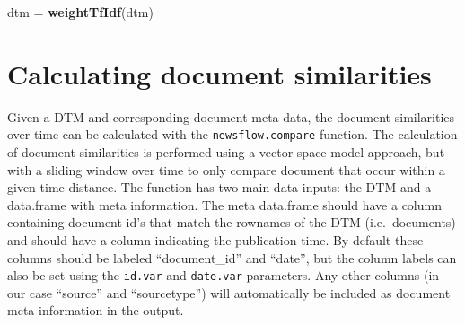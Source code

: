 \documentclass[]{article}
\newenvironment{Shaded}{\begin{snugshade}}{\end{snugshade}}
\newcommand{\KeywordTok}[1]{\textcolor[rgb]{0.13,0.29,0.53}{\textbf{{#1}}}}
\newcommand{\StringTok}[1]{\textcolor[rgb]{0.31,0.60,0.02}{{#1}}}
\newcommand{\NormalTok}[1]{{#1}}
\begin{document}
\begin{Shaded}
\begin{Highlighting}[]
\NormalTok{dtm =}\StringTok{ }\KeywordTok{weightTfIdf}\NormalTok{(dtm)}
\end{Highlighting}
\end{Shaded}

\section{Calculating document
similarities}\label{calculating-document-similarities}

Given a DTM and corresponding document meta data, the document
similarities over time can be calculated with the
\texttt{newsflow.compare} function. The calculation of document
similarities is performed using a vector space model
\citep{salton75, salton03} approach, but with a sliding window over time
to only compare document that occur within a given time distance. The
function has two main data inputs: the DTM and a data.frame with meta
information. The meta data.frame should have a column containing
document id's that match the rownames of the DTM (i.e.~documents) and
should have a column indicating the publication time. By default these
columns should be labeled ``document\_id'' and ``date'', but the column
labels can also be set using the \texttt{id.var} and \texttt{date.var}
parameters. Any other columns (in our case ``source'' and
``sourcetype'') will automatically be included as document meta
information in the output.
\end{document}
